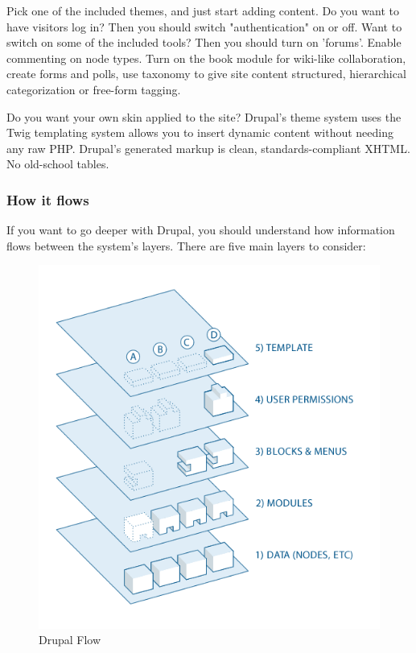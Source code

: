 Pick one of the included themes, and just start adding content. Do you want to have visitors log in? Then you should switch "authentication" on or off. Want to switch on some of the included tools? Then you should turn on 'forums'. Enable commenting on node types. Turn on the book module for wiki-like collaboration, create forms and polls, use taxonomy to give site content structured, hierarchical categorization or free-form tagging.

Do you want your own skin applied to the site? Drupal's theme system uses the Twig templating system allows you to insert dynamic content without needing any raw PHP. Drupal’s generated markup is clean, standards-compliant XHTML. No old-school tables.

\subsubsection{How it flows}

If you want to go deeper with Drupal, you should understand how information flows between the system's layers. There are five main layers to consider:

\begin{figure}[H]
\centering
\includegraphics[width=14cm]{Chapter3/drupal_flow.png}
\caption{Drupal Flow}
\label{fig:drupal_flow}
\end{figure}

